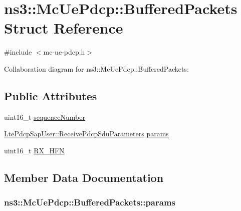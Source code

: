 \hypertarget{structns3_1_1McUePdcp_1_1BufferedPackets}{}\section{ns3\+:\+:Mc\+Ue\+Pdcp\+:\+:Buffered\+Packets Struct Reference}
\label{structns3_1_1McUePdcp_1_1BufferedPackets}


{\ttfamily \#include $<$mc-\/ue-\/pdcp.\+h$>$}



Collaboration diagram for ns3\+:\+:Mc\+Ue\+Pdcp\+:\+:Buffered\+Packets\+:
\subsection*{Public Attributes}
\begin{DoxyCompactItemize}
\item 
uint16\+\_\+t \hyperlink{structns3_1_1McUePdcp_1_1BufferedPackets_ab24391a3180a8d5eb77982a258048cab}{sequence\+Number}
\item 
\hyperlink{structns3_1_1LtePdcpSapUser_1_1ReceivePdcpSduParameters}{Lte\+Pdcp\+Sap\+User\+::\+Receive\+Pdcp\+Sdu\+Parameters} \hyperlink{structns3_1_1McUePdcp_1_1BufferedPackets_a8d2c342eefe3831978fd4bdda34d8fc9}{params}
\item 
uint16\+\_\+t \hyperlink{structns3_1_1McUePdcp_1_1BufferedPackets_a7dbe9990fa912c880f84a5a9301395bf}{R\+X\+\_\+\+H\+FN}
\end{DoxyCompactItemize}


\subsection{Member Data Documentation}
\subsubsection[{\texorpdfstring{params}{params}}]{ ns3\+::\+Mc\+Ue\+Pdcp\+::\+Buffered\+Packets\+::params}\hypertarget{structns3_1_1McUePdcp_1_1BufferedPackets_a8d2c342eefe3831978fd4bdda34d8fc9}{}\label{structns3_1_1McUePdcp_1_1BufferedPackets_a8d2c342eefe3831978fd4bdda34d8fc9}
